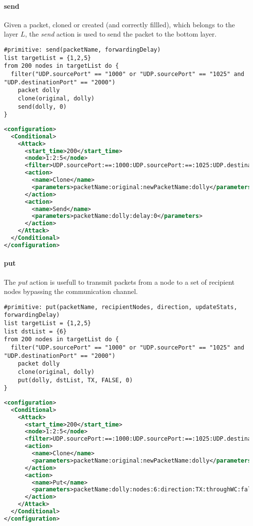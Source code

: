 \paragraph{send}
Given a packet, cloned or created (and correctly fillled), which belongs to the layer $L$, the \emph{send} action is used to send the packet to the bottom layer.
%
\begin{lstlisting}[language={asl},caption={ASL send example}]
#primitive: send(packetName, forwardingDelay)
list targetList = {1,2,5}
from 200 nodes in targetList do {
  filter("UDP.sourcePort" == "1000" or "UDP.sourcePort" == "1025" and "UDP.destinationPort" == "2000")
    packet dolly
    clone(original, dolly)
    send(dolly, 0)
}
\end{lstlisting}
%
\begin{lstlisting}[language={xml},caption={Interpreter output}]
<configuration>
  <Conditional>
    <Attack>
      <start_time>200</start_time>
      <node>1:2:5</node>
      <filter>UDP.sourcePort:==:1000:UDP.sourcePort:==:1025:UDP.destinationPort:==:2000:AND:OR</filter>
      <action>
        <name>Clone</name>          
        <parameters>packetName:original:newPacketName:dolly</parameters>                        
      </action>
      <action>
        <name>Send</name>
        <parameters>packetName:dolly:delay:0</parameters>
      </action>
    </Attack>
  </Conditional>
</configuration>
\end{lstlisting}

\paragraph{put}
The \emph{put} action is usefull to transmit packets from a node to a set of recipient nodes bypassing the communication channel.
%
\begin{lstlisting}[language={asl},caption={ASL put example}]
#primitive: put(packetName, recipientNodes, direction, updateStats, forwardingDelay)
list targetList = {1,2,5}
list dstList = {6}
from 200 nodes in targetList do {
  filter("UDP.sourcePort" == "1000" or "UDP.sourcePort" == "1025" and "UDP.destinationPort" == "2000")
    packet dolly
    clone(original, dolly)
    put(dolly, dstList, TX, FALSE, 0)
}
\end{lstlisting}
%
\begin{lstlisting}[language={xml},caption={Interpreter output}]
<configuration>
  <Conditional>
    <Attack>
      <start_time>200</start_time>
      <node>1:2:5</node>
      <filter>UDP.sourcePort:==:1000:UDP.sourcePort:==:1025:UDP.destinationPort:==:2000:AND:OR</filter>
      <action>
        <name>Clone</name>          
        <parameters>packetName:original:newPacketName:dolly</parameters>                        
      </action>
      <action>
        <name>Put</name>
        <parameters>packetName:dolly:nodes:6:direction:TX:throughWC:false:delay:0</parameters>
      </action>
    </Attack>
  </Conditional>
</configuration>
\end{lstlisting}



